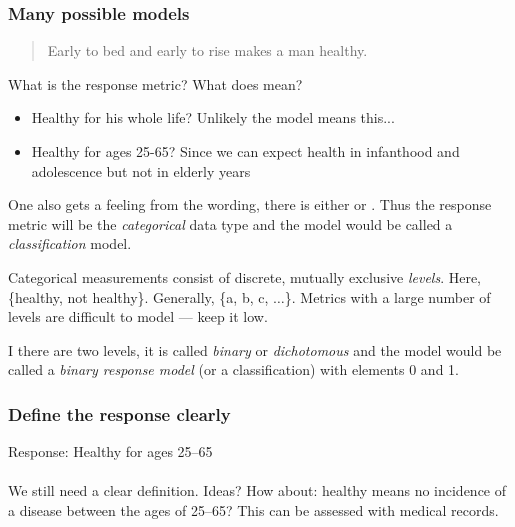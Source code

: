 \documentclass[slides]{beamer} %
\begin{document}
\begin{frame}\frametitle{Many possible models}

\small
\begin{quotation}
Early to bed and early to rise makes a man healthy.
\end{quotation}

What is the response metric? \pause What does  mean?\\

\begin{itemize}
\item Healthy for his whole life? Unlikely the model means this...
\item Healthy for ages 25-65? Since we can expect health in infanthood and adolescence but not in elderly years
\end{itemize}

One also gets a feeling from the wording, there is either  or . Thus the response metric will be the \textit{categorical} data type and the model would be called a \textit{classification} model. \\\vspace{0.2cm}

Categorical measurements consist of discrete, mutually exclusive \textit{levels}. Here, \{healthy, not healthy\}. Generally, \{a, b, c, $\ldots$\}. Metrics with a large number of levels are difficult to model --- keep it low.\\\vspace{0.2cm}

I there are two levels, it is called \textit{binary} or \textit{dichotomous} and the model would be called a \textit{binary response model} (or a classification) with elements 0 and 1.
	
\end{frame}

\begin{frame}\frametitle{Define the response clearly}

Response: Healthy for ages 25--65 \\~\\

We still need a clear definition. Ideas? How about: healthy means no incidence of a  disease between the ages of 25--65? This can be assessed with medical records. 
	
\end{frame}
\end{document}
